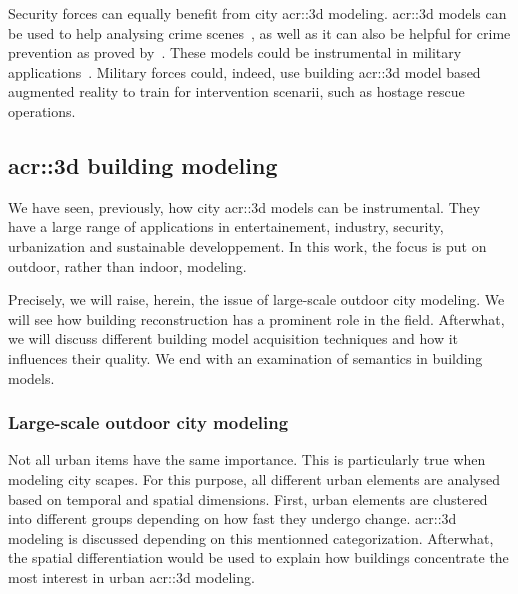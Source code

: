             Security forces can equally benefit from city \gls{acr::3d} modeling.
            \gls{acr::3d} models can be used to help analysing crime scenes~\parencite{wolff2009towards}, as well as it can also be helpful for crime prevention as proved by~\textcite{wolff2008geospatial}.
            These models could be instrumental in military applications~\textcite{zlatanova2002trends, budroni2010automatic}.
            Military forces could, indeed, use building \gls{acr::3d} model based augmented reality to train for intervention scenarii, such as hostage rescue operations.

    \subsection{\texorpdfstring{\gls*{acr::3d}}{3D} building modeling}
        \label{subsec::introduction::urban_3d_reconstruction::building_3d_modeling}
        We have seen, previously, how city \gls{acr::3d} models can be instrumental.
        They have a large range of applications in entertainement, industry, security, urbanization and sustainable developpement.
        In this work, the focus is put on outdoor, rather than indoor, modeling.\\

        \addtocounter{footnote}{-1}
        \addtocounter{footnote}{1}

    Precisely, we will raise, herein, the issue of large-scale outdoor city modeling.
        We will see how building reconstruction has a prominent role in the field.
        Afterwhat, we will discuss different building model acquisition techniques and how it influences their quality.
        We end with an examination of semantics in building models.

        \subsubsection{Large-scale outdoor city modeling}
            Not all urban items have the same importance.
            This is particularly true when modeling city scapes.
            For this purpose, all different urban elements are analysed based on temporal and spatial dimensions.
            First, urban elements are clustered into different groups depending on how fast they undergo change.
            \gls{acr::3d} modeling is discussed depending on this mentionned categorization.
            Afterwhat, the spatial differentiation would be used to explain how buildings concentrate the most interest in urban \gls{acr::3d} modeling.\\

